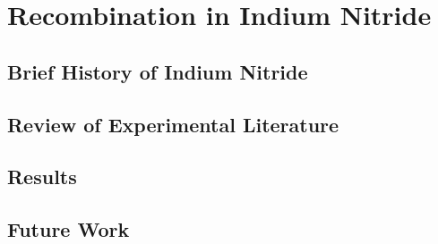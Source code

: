
\section{Recombination in Indium
Nitride}\label{recombination-in-indium-nitride}

\subsection{Brief History of Indium
Nitride}\label{brief-history-of-indium-nitride}

\subsection{Review of Experimental
Literature}\label{review-of-experimental-literature}

\subsection{Results}\label{results}

\subsection{Future Work}\label{future-work}
